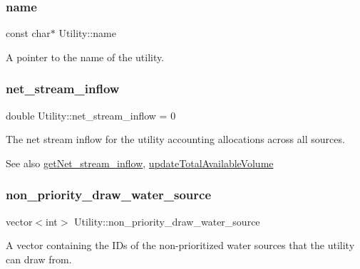 \subsubsection{\texorpdfstring{name}{name}}
{\footnotesize\ttfamily const char$\ast$ Utility\+::name}



A pointer to the name of the utility. 

\mbox{\label{classUtility_add2ce4f2dd3feefe6d9c28ca59f6a0de}} 
\subsubsection{\texorpdfstring{net\+\_\+stream\+\_\+inflow}{net\_stream\_inflow}}
{\footnotesize\ttfamily double Utility\+::net\+\_\+stream\+\_\+inflow = 0\hspace{0.3cm}{\ttfamily [private]}}



The net stream inflow for the utility accounting allocations across all sources. 

\begin{DoxySeeAlso}{See also}
\mbox{\hyperlink{classUtility_a93d865d309801d2b44687b2e14620386}{get\+Net\+\_\+stream\+\_\+inflow}}, \mbox{\hyperlink{classUtility_af394fe9f04a371a7cf10ddadba575e85}{update\+Total\+Available\+Volume}} 
\end{DoxySeeAlso}
\mbox{\label{classUtility_a815d7d43f3aca319f717c4e742b19df4}} 
\subsubsection{\texorpdfstring{non\+\_\+priority\+\_\+draw\+\_\+water\+\_\+source}{non\_priority\_draw\_water\_source}}
{\footnotesize\ttfamily vector$<$int$>$ Utility\+::non\+\_\+priority\+\_\+draw\+\_\+water\+\_\+source\hspace{0.3cm}{\ttfamily [private]}}



A vector containing the I\+Ds of the non-\/prioritized water sources that the utility can draw from. 

